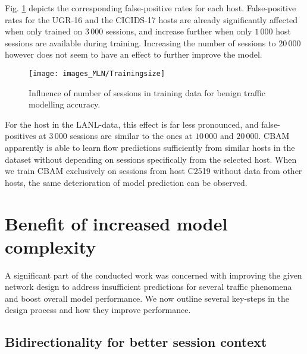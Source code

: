 Fig. \ref{figF:Trainingsize} depicts the corresponding false-positive rates for each host. False-positive rates for the UGR-16 and the CICIDS-17 hosts are already significantly affected when only trained on $3\,000$ sessions, and increase further when only $1\,000$ host sessions are available during training. Increasing the number of sessions to $20\,000$ however does not seem to have an effect to further improve the model.

\begin{figure}
\centering
\texttt{[image: images\_MLN/Trainingsize]} 
\caption{Influence of number of sessions in training data for benign traffic modelling accuracy.}\label{figF:Trainingsize}
\end{figure}
For the host in the LANL-data, this effect is far less pronounced, and false-positives at $3\,000$ sessions are similar to the ones at $10\,000$ and $20\,000$. CBAM apparently is able to learn flow predictions sufficiently from similar hosts in the dataset without depending on sessions specifically from the selected host. When we train CBAM exclusively on sessions from host C2519 without data from other hosts, the same deterioration of model prediction can be observed.

 






\section{Benefit of increased model complexity}\label{SecF:Modelcompl}

A significant part of the conducted work was concerned with improving the given network design to address insufficient predictions for several traffic phenomena and boost overall model performance. We now outline several key-steps in the design process and how they improve performance.

\subsection{Bidirectionality for better session context}\label{SecF:Bidir}

